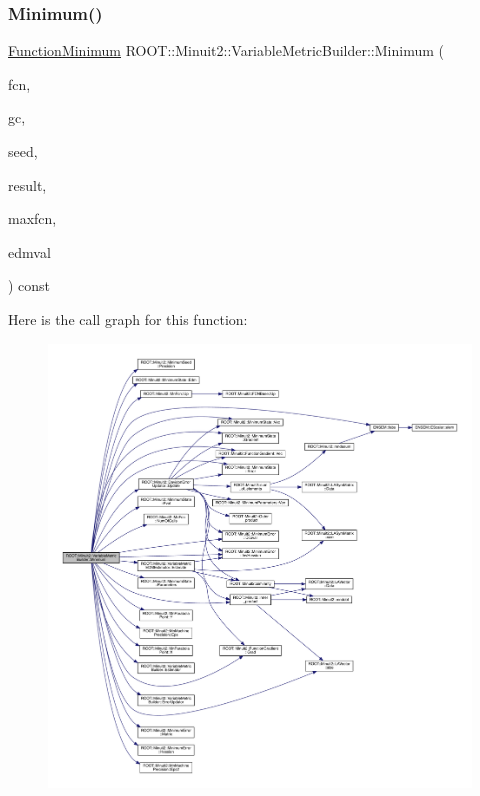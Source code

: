 \mbox{\label{classROOT_1_1Minuit2_1_1VariableMetricBuilder_a6214271e1802f110e94725295f3900fc}} 
\subsubsection{\texorpdfstring{Minimum()}{Minimum()}\hspace{0.1cm}{\footnotesize\ttfamily [6/6]}}
{\footnotesize\ttfamily \mbox{\hyperlink{classROOT_1_1Minuit2_1_1FunctionMinimum}{Function\+Minimum}} R\+O\+O\+T\+::\+Minuit2\+::\+Variable\+Metric\+Builder\+::\+Minimum (\begin{DoxyParamCaption}\item[{const \mbox{\hyperlink{classROOT_1_1Minuit2_1_1MnFcn}{Mn\+Fcn}} \&}]{fcn,  }\item[{const \mbox{\hyperlink{classROOT_1_1Minuit2_1_1GradientCalculator}{Gradient\+Calculator}} \&}]{gc,  }\item[{const \mbox{\hyperlink{classROOT_1_1Minuit2_1_1MinimumSeed}{Minimum\+Seed}} \&}]{seed,  }\item[{std\+::vector$<$ \mbox{\hyperlink{classROOT_1_1Minuit2_1_1MinimumState}{Minimum\+State}} $>$ \&}]{result,  }\item[{unsigned int}]{maxfcn,  }\item[{double}]{edmval }\end{DoxyParamCaption}) const}

Here is the call graph for this function\+:
\nopagebreak
\begin{figure}[H]
\begin{center}
\leavevmode
\includegraphics[width=350pt]{d5/d52/classROOT_1_1Minuit2_1_1VariableMetricBuilder_a6214271e1802f110e94725295f3900fc_cgraph}
\end{center}
\end{figure}


